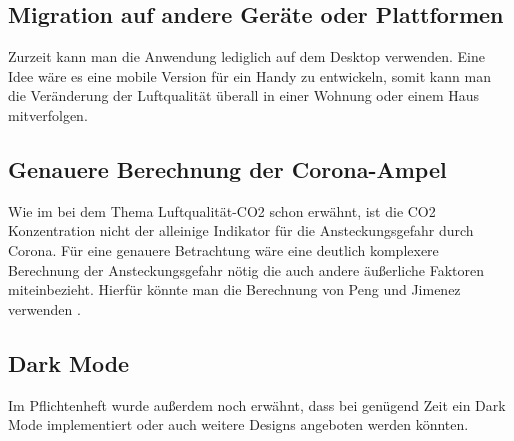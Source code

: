 \documentclass[]{article}
\begin{document}
		\subsection{Migration auf andere Geräte oder Plattformen}
			Zurzeit kann man die Anwendung lediglich auf dem Desktop verwenden. Eine Idee wäre es eine mobile Version für ein Handy zu entwickeln, somit kann man die Veränderung der Luftqualität überall in einer Wohnung oder einem Haus mitverfolgen. 
		\subsection{Genauere Berechnung der Corona-Ampel}
			Wie im bei dem Thema Luftqualität-CO2 schon erwähnt, ist die CO2 Konzentration nicht der alleinige Indikator für die Ansteckungsgefahr durch Corona. Für eine genauere Betrachtung wäre eine deutlich komplexere Berechnung der Ansteckungsgefahr nötig die auch andere äußerliche Faktoren miteinbezieht. Hierfür könnte man die Berechnung von Peng und Jimenez verwenden \cite{luftquali_co2_corona}.
		\subsection{Dark Mode}
			Im Pflichtenheft wurde außerdem noch erwähnt, dass bei genügend Zeit ein Dark Mode implementiert oder auch weitere Designs angeboten werden könnten. 	
		
		
\newpage
\printbibliography
\end{document}
